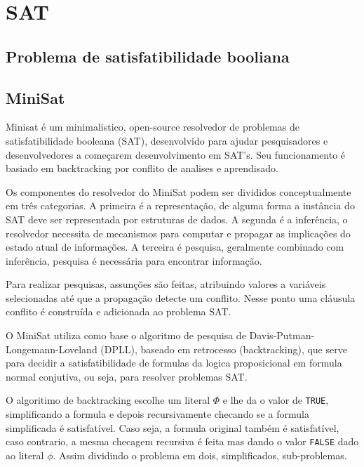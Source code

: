 \section{SAT}
\label{sec:sat}

\subsection{Problema de satisfatibilidade booliana}\label{sec:ssat}

\subsection{MiniSat}
\label{sec:minisat}

Minisat é um minimalistico, open-source resolvedor de problemas de satisfatibilidade booleana (SAT), desenvolvido para 
ajudar pesquisadores e desenvolvedores a começarem desenvolvimento em SAT's. Seu funcionamento é basiado em backtracking
por conflito de analises e aprendisado.

Os componentes do resolvedor do MiniSat podem ser divididos conceptualmente em três categorias. A primeira é a representação,
de alguma forma a instância do SAT deve ser representada por estruturas de dados. A segunda é a inferência, o resolvedor necessita
de mecanismos para computar e propagar as implicações do estado atual de informações. A terceira é pesquisa, geralmente combinado
com inferência, pesquisa é necessária para encontrar informação.

Para realizar pesquisas, assunções são feitas, atribuindo valores a variáveis selecionadas até que a propagação detecte um conflito.
Nesse ponto uma cláusula conflito é construída e adicionada ao problema SAT.

O MiniSat utiliza como base o algoritmo de pesquisa de Davis-Putman-Longemann-Loveland (DPLL), baseado em 
retrocesso (backtracking), que serve para decidir a satisfatibilidade de formulas da logica proposicional em formula normal
conjutiva, ou seja, para resolver problemas SAT.

O algoritimo de backtracking escolhe um literal $\Phi$ e lhe da o valor de \texttt{TRUE}, simplificando a formula e depois
recursivamente checando se a formula simplificada é satisfatível. Caso seja, a formula original também é
satisfatível, caso contrario, a mesma checagem recursiva é feita mas dando o valor \texttt{FALSE} dado ao literal $\phi$.
Assim dividindo o problema em dois, simplificados, sub-problemas.

